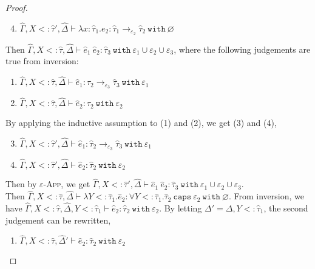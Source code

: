\documentclass{llncs}
\newcommand{\keywadj}[1]{\mathtt{#1}}
\newcommand{\keyw}[1]{\keywadj{#1}~}
\newcommand{\kw}[1]{\keyw{ #1 }}
\begin{document}
\begin{proof}
\begin{enumerate}
	\setcounter{enumi}{3}
	\item $\hat \Gamma, X <: \hat \tau', \hat \Delta \vdash \lambda x: \hat \tau_1. e_2: \hat \tau_1 \rightarrow_{\varepsilon_2} \hat \tau_2~\kw{with} \varnothing$
\end{enumerate}

 Then $\hat \Gamma, X <: \hat \tau, \hat \Delta \vdash \hat e_1~\hat e_2: \hat \tau_3~\kw{with} \varepsilon_1 \cup \varepsilon_2 \cup \varepsilon_3$, where the following judgements are true from inversion:

\begin{enumerate}
	\item $\hat \Gamma, X <: \hat \tau, \hat \Delta \vdash \hat e_1: \hat \tau_2 \rightarrow_{\varepsilon_3} \hat \tau_3 ~\kw{with} \varepsilon_1$
	\item $\hat \Gamma, X <: \hat \tau, \hat \Delta \vdash \hat e_2: \hat \tau_2~\kw{with} \varepsilon_2$
\end{enumerate}

By applying the inductive assumption to (1) and (2), we get (3) and (4),

\begin{enumerate}
	\setcounter{enumi}{2}
	\item $\hat \Gamma, X <: \hat \tau', \hat \Delta \vdash \hat e_1: \hat \tau_2 \rightarrow_{\varepsilon_3} \hat \tau_3 ~\kw{with} \varepsilon_1$
	\item $\hat \Gamma, X <: \hat \tau', \hat \Delta \vdash \hat e_2: \hat \tau_2~\kw{with} \varepsilon_2$
\end{enumerate}

Then by \textsc{$\varepsilon$-App}, we get $\hat \Gamma, X <: \hat \tau', \hat \Delta \vdash \hat e_1~\hat e_2: \hat \tau_3~\kw{with} \varepsilon_1 \cup \varepsilon_2 \cup \varepsilon_3$.\\

 Then $\hat \Gamma, X <: \hat \tau, \hat \Delta \vdash \lambda Y <: \hat \tau_1. \hat e_2: \forall Y <: \hat \tau_1. \hat \tau_2~\kw{caps} \varepsilon_2~\kw{with} \varnothing$. From inversion, we have $\hat \Gamma, X <: \hat \tau, \hat \Delta, Y <: \hat \tau_1 \vdash \hat e_2: \hat \tau_2~\kw{with} \varepsilon_2$. By letting $\Delta' = \Delta, Y <: \hat \tau_1$, the second judgement can be rewritten,

\begin{enumerate}
	\item $\hat \Gamma, X <: \hat \tau, \hat \Delta' \vdash \hat e_2: \hat \tau_2~\kw{with} \varepsilon_2$
\end{enumerate}


\end{proof}
\end{document}
